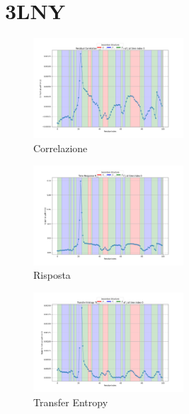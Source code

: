 \documentclass{article}
\begin{document}
\section{3LNY}
\begin{figure}[H]
    \centering
    \includegraphics[width=0.5\textwidth]{"images/3LNYResidual Correlation C_ij for i=22 as a function of j at time index 0.png"}
    \caption{Correlazione}
\end{figure}
\begin{figure}[H]
    \centering
    \includegraphics[width=0.5\textwidth]{"images/3LNYTime Response R_ij for i=22 as a function of j at time index 0.png"}
    \caption{Risposta}
\end{figure}

\begin{figure}[H]
    \centering
    \includegraphics[width=0.5\textwidth]{"images/3LNYTransfer Entropy TE_ij for i=22 as a function of j at time index 0.png"}
    \caption{Transfer Entropy}
\end{figure}
\end{document}
